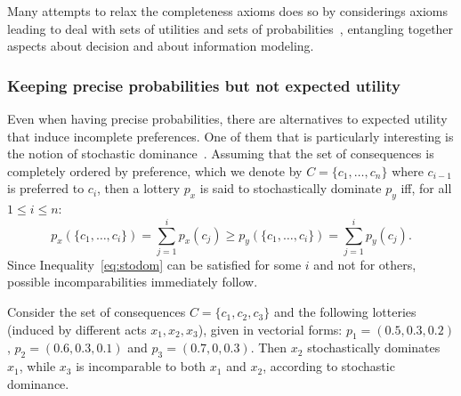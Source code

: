 \documentclass[french, english]{llncs}
\begin{document}
Many attempts to relax the completeness axioms does so by considerings axioms leading to deal with sets of utilities and sets of probabilities~\citep{aumann_utility_1962}, entangling together aspects about decision and about information modeling. 
	
\subsubsection{Keeping precise probabilities but not expected utility}

Even when having precise probabilities, there are alternatives to expected utility that induce incomplete preferences. One of them that is particularly interesting is the notion of stochastic dominance~\citep{levy_stochastic_1992}. Assuming that the set of consequences is completely ordered by preference, which we denote by $C = \{c_1, …, c_n\}$ where $c_{i-1}$ is preferred to $c_{i}$, then a lottery $p_x$ is said to stochastically dominate $p_y$ iff, for all $1 ≤ i ≤ n$:
\begin{equation}\label{eq:stodom}
p_x(\{c_1,\ldots,c_i\})=\sum_{j=1}^i p_x(c_j) ≥ p_y(\{c_1,\ldots,c_i\})=\sum_{j=1}^i p_y(c_j).
\end{equation}
Since Inequality~\eqref{eq:stodom} can be satisfied for some $i$ and not for others, possible incomparabilities immediately follow. %
	
\begin{example}
Consider the set of consequences $C=\{c_1, c_2, c_3\}$ and the following lotteries (induced by different acts $x_1,x_2,x_3$), given in vectorial forms: $p_1=(0.5, 0.3, 0.2)$, $p_2=(0.6, 0.3, 0.1)$ and $p_3=(0.7, 0, 0.3)$. 
Then $x_2$ stochastically dominates $x_1$, while $x_3$ is incomparable to both $x_1$ and $x_2$, according to stochastic dominance.
\end{example}
	
\end{document}
